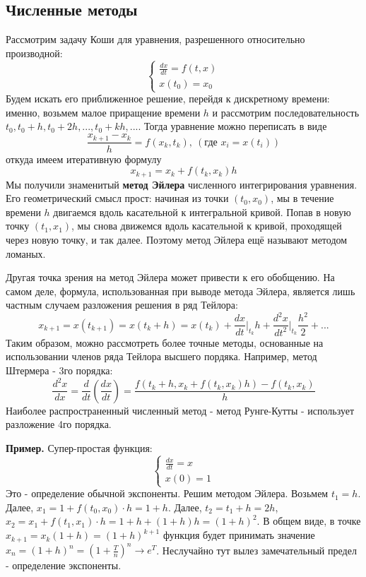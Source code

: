 \subsection{Численные методы}
Рассмотрим задачу Коши для уравнения, разрешенного относительно производной:
$$\begin{cases}
    \frac{dx}{dt}=f(t,x)\\x(t_0)=x_0
\end{cases}$$ 
Будем искать его приближенное решение, перейдя к дискретному времени:
именно, возьмем малое приращение времени $h$ и рассмотрим последовательность
$t_0,t_0+h,t_0+2h,...,t_0+kh,...$. Тогда уравнение можно переписать в виде 
$$\frac{x_{k+1}-x_k}{h}=f(x_k,t_k),~(\textit{где } x_i=x(t_i))$$ 
откуда имеем итеративную формулу
$$x_{k+1}=x_k+f(t_k,x_k)h$$ 
Мы получили знаменитый \textbf{метод Эйлера} численного интегрирования
уравнения. Его геометрический смысл прост: начиная из точки 
$(t_0,x_0)$, мы в течение времени $h$ двигаемся вдоль касательной к 
интегральной кривой. Попав в новую точку $(t_1,x_1)$, мы снова движемся вдоль 
касательной к кривой, проходящей через новую точку, и так далее. Поэтому 
метод Эйлера ещё называют методом ломаных.

Другая точка зрения на метод Эйлера может привести к его обобщению. 
На самом деле, формула, использованная при выводе метода Эйлера, является
лишь частным случаем разложения решения в ряд Тейлора:
$$x_{k+1}=x(t_{k+1})=x(t_k+h)=x(t_k)+\frac{dx}{dt}\bigg|_{t_k}h+
\frac{d^2x}{dt^2}\bigg|_{t_k}\frac{h^2}{2}+...$$
Таким образом, можно рассмотреть более точные методы, основанные на 
использовании членов ряда Тейлора высшего пордяка.
Например, метод Штермера - 3го порядка:
$$\frac{d^2x}{dx}=\frac{d}{dt}\left( \frac{dx}{dt} \right)=
\frac{f(t_k+h,x_k+f(t_k,x_k)h)-f(t_k,x_k)}{h}$$
Наиболее распространенный численный метод - метод  Рунге-Кутты - использует
разложение 4го порядка.

\textbf{Пример.} Супер-простая функция:
$$\begin{cases}
    \frac{dx}{dt}=x\\x(0)=1
\end{cases}$$
Это - определение обычной экспоненты. Решим методом Эйлера. Возьмем
$t_1=h$. Далее,  $x_1=1+f(t_0,x_0)\cdot h=1+h$. Далее,
 $t_2=t_1+h=2h$, $x_2=x_1+f(t_1,x_1)\cdot h=1+h+(1+h)h=(1+h)^2$.
 В общем виде, в точке $x_{k+1}=x_k(1+h)=(1+h)^{k+1}$ 
 функция будет принимать значение $x_n=(1+h)^{n}=\left( 1+\frac{T}{n}\right)^n
\to e^T$.
Неслучайно тут вылез замечательный предел - определение экспоненты.


